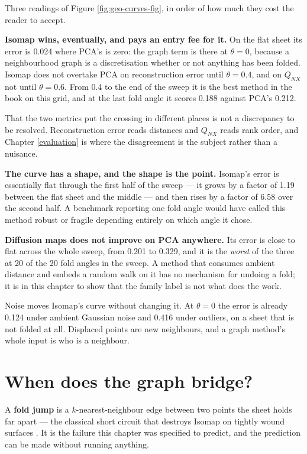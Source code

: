 \documentclass[
  british,
  a4paper,
]{book}
\begin{document}
Three readings of Figure \ref{fig:geo-curves-fig}, in order of how much they
cost the reader to accept.

\textbf{Isomap wins, eventually, and pays an entry fee for it.} On the flat sheet its
error is 0.024 where PCA's is zero: the graph term is
there at \(\theta = 0\), because a neighbourhood graph is a discretisation whether
or not anything has been folded. Isomap does not overtake PCA on reconstruction
error until \(\theta = 0.4\), and on \(Q_{NX}\) not until
\(\theta = 0.6\). From 0.4 to the end of the sweep it is the
best method in the book on this grid, and at the last fold angle it scores
0.188 against PCA's
0.212.

That the two metrics put the crossing in different places is not a discrepancy to
be resolved. Reconstruction error reads distances and \(Q_{NX}\) reads rank order,
and Chapter \ref{evaluation} is where the disagreement is the subject rather
than a nuisance.

\textbf{The curve has a shape, and the shape is the point.} Isomap's error is
essentially flat through the first half of the sweep --- it grows by a factor of
1.19 between the flat sheet and the
middle --- and then rises by a factor of
6.58 over the second
half. A benchmark reporting one fold angle would have called this method robust
or fragile depending entirely on which angle it chose.

\textbf{Diffusion maps does not improve on PCA anywhere.} Its error is close to flat
across the whole sweep, from 0.201 to
0.329, and it is the \emph{worst} of the
three at
20 of the
20 fold angles in the sweep. A method that consumes ambient
distance and embeds a random walk on it has no mechanism for undoing a fold; it
is in this chapter to show that the family label is not what does the work.

Noise moves Isomap's curve without changing it. At \(\theta = 0\) the error is
already 0.124
under ambient Gaussian noise and
0.416 under
outliers, on a sheet that is not folded at all. Displaced points are new
neighbours, and a graph method's whole input is who is a neighbour.

\section{When does the graph bridge?}\label{geo-bridge}

A \textbf{fold jump} is a \(k\)-nearest-neighbour edge between two points the sheet
holds far apart --- the classical short circuit that destroys Isomap on tightly
wound surfaces \citep{balasubramanian2002isomap}. It is the failure this chapter was
specified to predict, and the prediction can be made without running anything.
\end{document}

